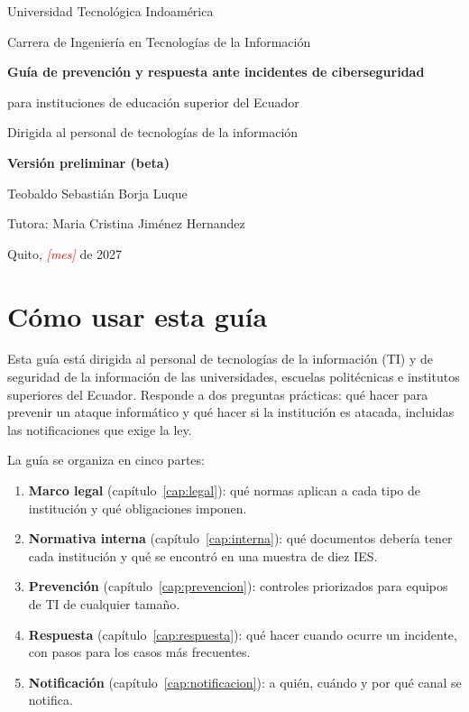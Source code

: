 \documentclass[11pt,a4paper,oneside]{report}
\newcommand{\pendiente}[1]{\textcolor{red}{\textit{[#1]}}}
\begin{document}
\begin{titlepage}
  \centering
  {\large Universidad Tecnológica Indoamérica\par}
  {\large Carrera de Ingeniería en Tecnologías de la Información\par}
  \vspace{4cm}
  {\Huge\bfseries Guía de prevención y respuesta ante incidentes de ciberseguridad\par}
  \vspace{0.8cm}
  {\Large para instituciones de educación superior del Ecuador\par}
  \vspace{0.6cm}
  {\large Dirigida al personal de tecnologías de la información\par}
  \vspace{0.6cm}
  {\large\color{red}\textbf{Versión preliminar (beta)}\par}
  \vfill
  {\large Teobaldo Sebastián Borja Luque\par}
  {\large Tutora: Maria Cristina Jiménez Hernandez\par}
  \vspace{0.6cm}
  {\large Quito, \pendiente{mes} de 2027\par}
\end{titlepage}

\tableofcontents

\chapter{Cómo usar esta guía}
Esta guía está dirigida al personal de tecnologías de la información (TI) y de seguridad de la información de las universidades, escuelas politécnicas e institutos superiores del Ecuador. Responde a dos preguntas prácticas: qué hacer para prevenir un ataque informático y qué hacer si la institución es atacada, incluidas las notificaciones que exige la ley.

La guía se organiza en cinco partes:
\begin{enumerate}[leftmargin=*]
  \item \textbf{Marco legal} (capítulo~\ref{cap:legal}): qué normas aplican a cada tipo de institución y qué obligaciones imponen.
  \item \textbf{Normativa interna} (capítulo~\ref{cap:interna}): qué documentos debería tener cada institución y qué se encontró en una muestra de diez IES.
  \item \textbf{Prevención} (capítulo~\ref{cap:prevencion}): controles priorizados para equipos de TI de cualquier tamaño.
  \item \textbf{Respuesta} (capítulo~\ref{cap:respuesta}): qué hacer cuando ocurre un incidente, con pasos para los casos más frecuentes.
  \item \textbf{Notificación} (capítulo~\ref{cap:notificacion}): a quién, cuándo y por qué canal se notifica.
\end{enumerate}
\end{document}

